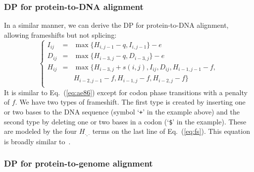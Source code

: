 \documentclass{bioinfo}
\begin{document}
\begin{methods}
\subsubsection{DP for protein-to-DNA alignment}

In a similar manner, we can derive the DP for protein-to-DNA alignment,
allowing frameshifts but not splicing:
\begin{equation}\label{eq:fs}
\left\{\begin{array}{lll}
I_{ij}&=&\max\{ H_{i,j-1} - q, I_{i,j-1} \} - e \\
D_{ij}&=&\max\{ H_{i-3,j} - q, D_{i-3,j} \} - e \\
H_{ij}&=&\max\{ H_{i-3,j}+s(i,j), I_{ij}, D_{ij}, H_{i-1,j-1}-f, \\
       && H_{i-2,j-1}-f, H_{i-1,j}-f, H_{i-2,j}-f \} \\
\end{array}\right.
\end{equation}
It is similar to Eq.~(\ref{eq:ae86}) except for codon phase transitions with a
penalty of $f$. We have two types of frameshift. The first type is created by
inserting one or two bases to the DNA sequence (symbol `{\tt +}' in the example
above) and the second type by deleting one or two bases in a codon (`{\tt \$}'
in the example). These are modeled by the four $H_{\cdot,\cdot}$ terms on the
last line of Eq.~(\ref{eq:fs}).  This equation is broadly similar
to~\citet{Zhang:1997tq}.

\subsubsection{DP for protein-to-genome alignment}


\end{methods}
\end{document}
